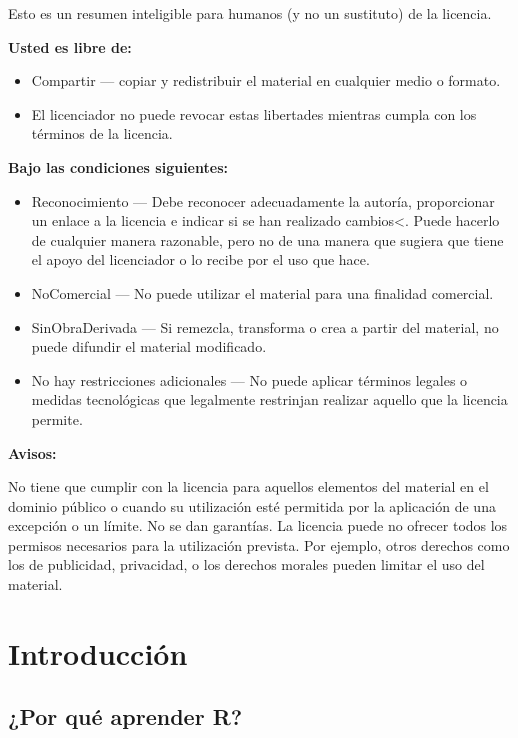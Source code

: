 \documentclass[
]{book}
\providecommand{\tightlist}{%
  \setlength{\itemsep}{0pt}\setlength{\parskip}{0pt}}
\begin{document}
Esto es un resumen inteligible para humanos (y no un sustituto) de la licencia.

\textbf{Usted es libre de:}

\begin{itemize}
\tightlist
\item
  Compartir --- copiar y redistribuir el material en cualquier medio o formato.
\item
  El licenciador no puede revocar estas libertades mientras cumpla con los términos de la licencia.
\end{itemize}

\textbf{Bajo las condiciones siguientes:}

\begin{itemize}
\item
  Reconocimiento --- Debe reconocer adecuadamente la autoría, proporcionar un enlace a la licencia e indicar si se han realizado cambios\textless. Puede hacerlo de cualquier manera razonable, pero no de una manera que sugiera que tiene el apoyo del licenciador o lo recibe por el uso que hace.
\item
  NoComercial --- No puede utilizar el material para una finalidad comercial.
\item
  SinObraDerivada --- Si remezcla, transforma o crea a partir del material, no puede difundir el material modificado.
\item
  No hay restricciones adicionales --- No puede aplicar términos legales o medidas tecnológicas que legalmente restrinjan realizar aquello que la licencia permite.
\end{itemize}

\textbf{Avisos: }

No tiene que cumplir con la licencia para aquellos elementos del material en el dominio público o cuando su utilización esté permitida por la aplicación de una excepción o un límite.
No se dan garantías. La licencia puede no ofrecer todos los permisos necesarios para la utilización prevista. Por ejemplo, otros derechos como los de publicidad, privacidad, o los derechos morales pueden limitar el uso del material.

\hypertarget{intro}{%
\chapter{Introducción}\label{intro}}

\hypertarget{por-quuxe9-aprender-r}{%
\section{¿Por qué aprender R?}\label{por-quuxe9-aprender-r}}
\end{document}
